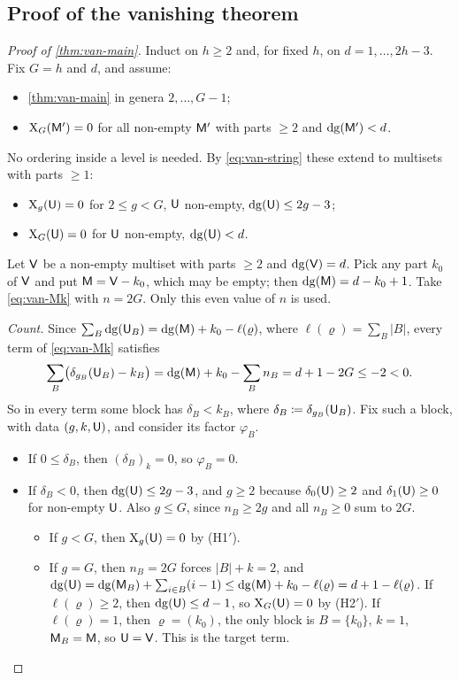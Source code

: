 \subsection{Proof of the vanishing theorem}
\label{sec:van-proof}

\begin{proof}[Proof of \cref{thm:van-main}]
Induct on $h\geq 2$ and, for fixed $h$, on $d=1,\dots,2h-3$. Fix $G=h$ and $d$, and assume:
\begin{itemize}
\item[(H1)] \cref{thm:van-main} in genera $2,\dots,G-1$;
\item[(H2)] $\mathrm{X}_G(\mathsf{M}')=0$ for all non-empty $\mathsf{M}'$ with parts $\geq 2$ and $\mathrm{dg}(\mathsf{M}')<d$.
\end{itemize}
No ordering inside a level is needed. By \eqref{eq:van-string} these extend to multisets with parts $\geq 1$:
\begin{itemize}
\item[(H1$'$)] $\mathrm{X}_g(\mathsf{U})=0$ for $2\leq g<G$, $\mathsf{U}$ non-empty, $\mathrm{dg}(\mathsf{U})\leq 2g-3$;
\item[(H2$'$)] $\mathrm{X}_G(\mathsf{U})=0$ for $\mathsf{U}$ non-empty, $\mathrm{dg}(\mathsf{U})<d$.
\end{itemize}

Let $\mathsf{V}$ be a non-empty multiset with parts $\geq 2$ and $\mathrm{dg}(\mathsf{V})=d$. Pick any part $k_0$ of $\mathsf{V}$ and put $\mathsf{M}=\mathsf{V}-k_0$, which may be empty; then $\mathrm{dg}(\mathsf{M})=d-k_0+1$. Take \eqref{eq:van-Mk} with $n=2G$. Only this even value of $n$ is used.

\emph{Count.} Since $\sum_B\mathrm{dg}(\mathsf{U}_B)=\mathrm{dg}(\mathsf{M})+k_0-\ell(\varrho)$, where $\ell(\varrho)=\sum_B\lvert B\rvert$, every term of \eqref{eq:van-Mk} satisfies
\[
\sum_B\bigl(\delta_{g_B}(\mathsf{U}_B)-k_B\bigr)=\mathrm{dg}(\mathsf{M})+k_0-\sum_Bn_B=d+1-2G\leq-2<0.
\]
So in every term some block has $\delta_B<k_B$, where $\delta_B\coloneqq\delta_{g_B}(\mathsf{U}_B)$. Fix such a block, with data $(g,k,\mathsf{U})$, and consider its factor $\varphi_B$.
\begin{itemize}
\item If $0\leq\delta_B$, then $(\delta_B)_k=0$, so $\varphi_B=0$.
\item If $\delta_B<0$, then $\mathrm{dg}(\mathsf{U})\leq 2g-3$, and $g\geq 2$ because $\delta_0(\mathsf{U})\geq 2$ and $\delta_1(\mathsf{U})\geq 0$ for non-empty $\mathsf{U}$. Also $g\leq G$, since $n_B\geq 2g$ and all $n_B\geq 0$ sum to $2G$.
\begin{itemize}
\item If $g<G$, then $\mathrm{X}_g(\mathsf{U})=0$ by (H1$'$).
\item If $g=G$, then $n_B=2G$ forces $\lvert B\rvert+k=2$, and $\mathrm{dg}(\mathsf{U})=\mathrm{dg}(\mathsf{M}_B)+\sum_{i\in B}(i-1)\leq\mathrm{dg}(\mathsf{M})+k_0-\ell(\varrho)=d+1-\ell(\varrho)$. If $\ell(\varrho)\geq 2$, then $\mathrm{dg}(\mathsf{U})\leq d-1$, so $\mathrm{X}_G(\mathsf{U})=0$ by (H2$'$). If $\ell(\varrho)=1$, then $\varrho=(k_0)$, the only block is $B=\{k_0\}$, $k=1$, $\mathsf{M}_B=\mathsf{M}$, so $\mathsf{U}=\mathsf{V}$. This is the target term.
\end{itemize}
\end{itemize}


\end{proof}
